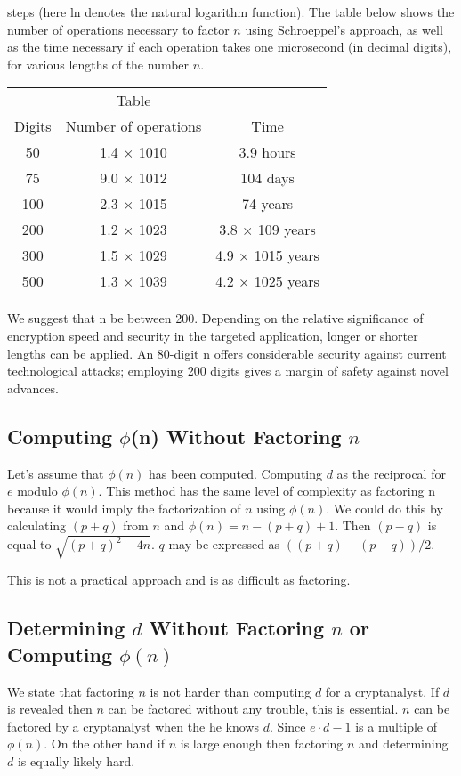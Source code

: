 \documentclass[12pt, letterpaper]{article}
\begin{document}
steps (here ln denotes the natural logarithm function). The table below shows the number of operations necessary to factor $n$ using Schroeppel's approach, as well as the time necessary if each operation takes one microsecond (in decimal digits), for various lengths of the number $n$.

\begin{tabular}{ccc}
& Table & \\
Digits & Number of operations & Time \\
50 & 1.4 × 1010 & 3.9 hours \\
75 & 9.0 × 1012 & 104 days \\
100 & 2.3 × 1015 & 74 years \\
200 & 1.2 × 1023 & 3.8 × 109 years \\
300 & 1.5 × 1029 & 4.9 × 1015 years \\
500 & 1.3 × 1039 & 4.2 × 1025 years \\
\end{tabular}

We suggest that n be between 200. Depending on the relative significance of encryption speed and security in the targeted application, longer or shorter lengths can be applied. An 80-digit n offers considerable security against current technological attacks; employing 200 digits gives a margin of safety against novel advances.

\subsection{Computing $\phi$(n) Without Factoring $n$}

Let’s assume that $\phi(n)$ has been computed. Computing $d$ as the reciprocal for $e$ modulo $\phi(n)$. This method has the same level of complexity as factoring n because it would imply the factorization of $n$ using $\phi(n)$. We could do this by calculating $(p+q)$ from $n$ and $\phi(n) = n - (p+q) + 1$. Then $(p-q)$ is equal to $\sqrt{(p+q)^2-4n}$. $q$ may be expressed as $((p+q)-(p-q))/2$.

This is not a practical approach and is as difficult as factoring.

\subsection{Determining $d$ Without Factoring $n$ or Computing $\phi(n)$}

We state that factoring $n$ is not harder than computing $d$ for a cryptanalyst. If $d$ is revealed then $n$ can be factored without any trouble, this is essential. $n$ can be factored by a cryptanalyst when the he  knows $d$. Since  $e \cdot d - 1$ is a multiple of $\phi(n)$. On the other hand if $n$ is large enough then factoring $n$ and determining $d$ is equally likely hard.
\end{document}
